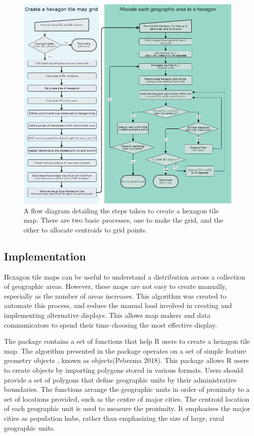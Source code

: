 \begin{figure}
\includegraphics[width=1\linewidth]{figs/sugarbag_flow} \caption{A flow diagram detailing the steps taken to create a hexagon tile map. There are two basic processes, one to make the grid, and the other to allocate centroids to grid points.}\label{fig:sugarbagflow}
\end{figure}

\hypertarget{implementation}{%
\subsection{Implementation}\label{implementation}}

Hexagon tile maps can be useful to understand a distribution across a collection of geographic areas. However, these maps are not easy to create manually, especially as the number of areas increases. This algorithm was created to automate this process, and reduce the manual load involved in creating and implementing alternative displays. This allows map makers and data communicators to spend their time choosing the most effective display.

The  package contains a set of functions that help R users to create a hexagon tile map. The algorithm presented in the  package operates on a set of simple feature geometry objects , known as  objects(Pebesma 2018). This package allows R users to create  objects by importing polygons stored in various formats. Users should provide a set of polygons that define geographic units by their administrative boundaries. The functions arrange the geographic units in order of proximity to a set of locations provided, such as the centre of major cities. The centroid location of each geographic unit is used to measure the proximity. It emphasises the major cities as population hubs, rather than emphasizing the size of large, rural geographic units.

